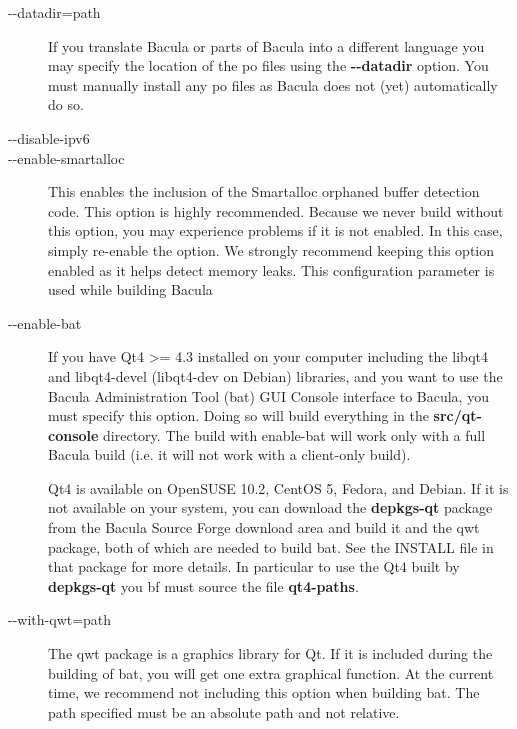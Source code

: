 \begin{description}
\item [ {-}{-}datadir=\lt{}path\gt{} ]
   If you translate Bacula or parts of Bacula into a different language
   you may specify the location of the po files using the {\bf
   {-}{-}datadir} option. You must manually install any po files as
   Bacula does not (yet) automatically do so.

\item [ {-}{-}disable-ipv6 ]

\item [ {-}{-}enable-smartalloc ]
   This enables the inclusion of the Smartalloc orphaned buffer detection
   code.  This option is highly recommended.  Because we never build
   without this option, you may experience problems if it is not enabled.
   In this case, simply re-enable the option.  We strongly recommend
   keeping this option enabled as it helps detect memory leaks.  This
   configuration parameter is used while building Bacula

\item [ {-}{-}enable-bat ]
   \label{enablebat}
   If you have Qt4 >= 4.3 installed on your computer including the
   libqt4 and libqt4-devel (libqt4-dev on Debian) libraries, and you want
   to use the Bacula Administration Tool (bat) GUI Console interface to
   Bacula, you must specify this option.  Doing so will build everything in
   the {\bf src/qt-console} directory.  The build with enable-bat will work
   only with a full Bacula build (i.e. it will not work with a client-only
   build). 

   Qt4 is available on OpenSUSE 10.2, CentOS 5, Fedora, and Debian. If it
   is not available on your system, you can download the {\bf depkgs-qt}
   package from the Bacula Source Forge download area and build it and
   the qwt package, both of which are needed to build bat.  See the
   INSTALL file in that package for more details. In particular to use
   the Qt4 built by {\bf depkgs-qt} you {bf must} source the file
   {\bf qt4-paths}.

\item [ {-}{-}with-qwt=\lt{}path\gt{} ]
  The qwt package is a graphics library for Qt. If it is included
  during the building of bat, you will get one extra graphical function.
  At the current time, we recommend not including this option when
  building bat. The path specified must be an absolute path and
  not relative.  


\end{description}
